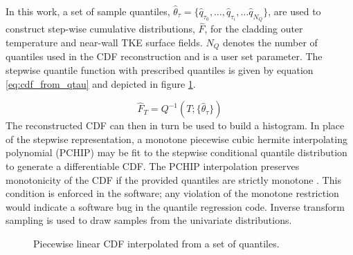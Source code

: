 In this work, a set of sample quantiles, $\hat \theta_\tau = \{\hat q_{\tau_0}, \dots, \hat q_{\tau_i}, \dots \hat q_{N_Q} \}$, are used to construct step-wise cumulative distributions, $\hat F$, for the cladding outer temperature and near-wall TKE surface fields.  $N_Q$ denotes the number of quantiles used in the CDF reconstruction and is a user set parameter. The stepwise quantile function with prescribed quantiles is given by equation \ref{eq:cdf_from_qtau} and depicted in figure \ref{fig:marginscdf2}.

\begin{equation}
\hat F_{T}= Q^{-1}(T; \{\hat{\theta}_{\tau} \})
\label{eq:cdf_from_qtau}
\end{equation}
The reconstructed CDF can then in turn be used to build a histogram.  In place of the stepwise representation, a monotone piecewise cubic hermite interpolating polynomial (PCHIP) may be fit to the stepwise conditional quantile distribution to generate a differentiable CDF.
The PCHIP interpolation preserves monotonicity of the CDF if the provided quantiles are strictly monotone \cite{Fritsch80}.  This condition is enforced in the software; any violation of the monotone restriction would indicate a software bug in the quantile regression code.  Inverse transform sampling is used to draw samples from the univariate distributions.

\begin{figure}
	\centering
	\caption[CDF from quantiles.]{Piecewise linear CDF interpolated from a set of quantiles.}
	\label{fig:marginscdf2}
\end{figure}

